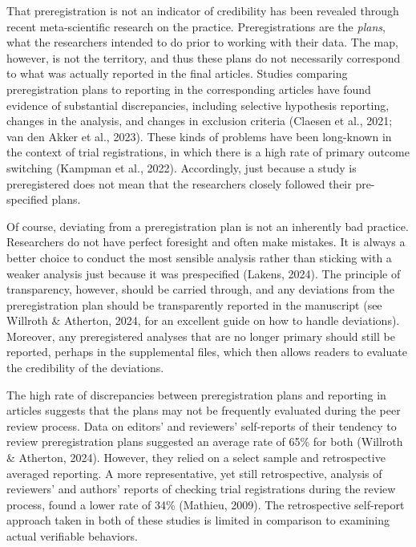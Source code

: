 \documentclass[authordate, empirical]{jote-new-article}
\begin{document}
	That preregistration is not an indicator of credibility has been revealed through recent meta-scientific research on the practice. Preregistrations are the \emph{plans}, what the researchers intended to do prior to working with their data. The map, however, is not the territory, and thus these plans do not necessarily correspond to what was actually reported in the final articles. Studies comparing preregistration plans to reporting in the corresponding articles have found evidence of substantial discrepancies, including selective hypothesis reporting, changes in the analysis, and changes in exclusion criteria (Claesen et al., 2021; van den Akker et al., 2023). These kinds of problems have been long-known in the context of trial registrations, in which there is a high rate of primary outcome switching (Kampman et al., 2022). Accordingly, just because a study is preregistered does not mean that the researchers closely followed their pre-specified plans.



	Of course, deviating from a preregistration plan is not an inherently bad practice. Researchers do not have perfect foresight and often make mistakes. It is always a better choice to conduct the most sensible analysis rather than sticking with a weaker analysis just because it was prespecified (Lakens, 2024). The principle of transparency, however, should be carried through, and any deviations from the preregistration plan should be transparently reported in the manuscript (see Willroth \& Atherton, 2024, for an excellent guide on how to handle deviations). Moreover, any preregistered analyses that are no longer primary should still be reported, perhaps in the supplemental files, which then allows readers to evaluate the credibility of the deviations.



	The high rate of discrepancies between preregistration plans and reporting in articles suggests that the plans may not be frequently evaluated during the peer review process. Data on editors' and reviewers' self-reports of their tendency to review preregistration plans suggested an average rate of 65\% for both (Willroth \& Atherton, 2024). However, they relied on a select sample and retrospective averaged reporting. A more representative, yet still retrospective, analysis of reviewers' and authors' reports of checking trial registrations during the review process, found a lower rate of 34\% (Mathieu, 2009). The retrospective self-report approach taken in both of these studies is limited in comparison to examining actual verifiable behaviors.
\end{document}
